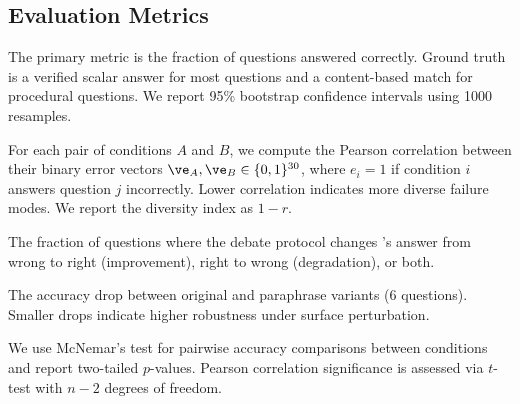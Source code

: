 \subsection{Evaluation Metrics}

The primary metric is the fraction of questions answered correctly.
Ground truth is a verified scalar answer for most questions and
a content-based match for procedural questions.
We report 95\% bootstrap confidence intervals using 1000 resamples.

For each pair of conditions $A$ and $B$, we compute the Pearson correlation
between their binary error vectors $\ve_A, \ve_B \in \{0,1\}^{30}$,
where $e_i = 1$ if condition $i$ answers question $j$ incorrectly.
Lower correlation indicates more diverse failure modes.
We report the diversity index as $1 - r$.

The fraction of questions where the debate protocol changes \haiku's answer
from wrong to right (improvement), right to wrong (degradation), or both.

The accuracy drop between original and paraphrase variants (6 questions).
Smaller drops indicate higher robustness under surface perturbation.

We use McNemar's test for pairwise accuracy comparisons between conditions
and report two-tailed $p$-values.
Pearson correlation significance is assessed via $t$-test with $n{-}2$ degrees of freedom.
